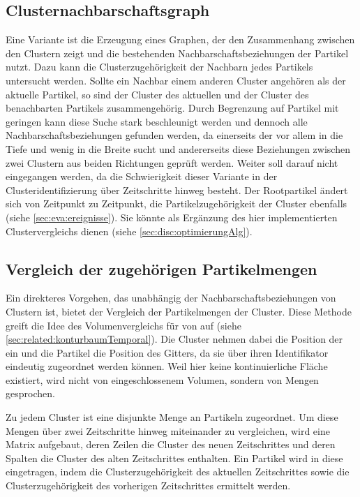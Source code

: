 \subsection*{Clusternachbarschaftsgraph}
Eine Variante ist die Erzeugung eines Graphen, der den Zusammenhang zwischen den Clustern zeigt und die bestehenden Nachbarschaftsbeziehungen der Partikel nutzt. Dazu kann die Clusterzugehörigkeit der Nachbarn jedes Partikels untersucht werden. Sollte ein Nachbar einem anderen Cluster angehören als der aktuelle Partikel, so sind der Cluster des aktuellen und der Cluster des benachbarten Partikels zusammengehörig. Durch Begrenzung auf Partikel mit geringen  kann diese Suche stark beschleunigt werden und dennoch alle Nachbarschaftsbeziehungen gefunden werden, da einerseits der \CFD vor allem in die Tiefe und wenig in die Breite sucht und andererseits diese Beziehungen zwischen zwei Clustern aus beiden Richtungen geprüft werden.
Weiter soll darauf nicht eingegangen werden, da die Schwierigkeit dieser Variante in der Clusteridentifizierung über Zeitschritte hinweg besteht. Der Rootpartikel ändert sich von Zeitpunkt zu Zeitpunkt, die Partikelzugehörigkeit der Cluster ebenfalls (siehe \autoref{sec:eva:ereignisse}). Sie könnte als Ergänzung des hier implementierten Clustervergleichs dienen (siehe \autoref{sec:disc:optimierungAlg}).

\subsection*{Vergleich der zugehörigen Partikelmengen}
Ein direkteres Vorgehen, das unabhängig der Nachbarschaftsbeziehungen von Clustern ist, bietet der Vergleich der Partikelmengen der Cluster. Diese Methode greift die Idee des Volumenvergleichs für  von  auf (siehe \autoref{sec:related:konturbaumTemporal}). Die Cluster nehmen dabei die Position der  ein und die Partikel die Position des Gitters, da sie über ihren Identifikator eindeutig zugeordnet werden können. Weil hier keine kontinuierliche Fläche existiert, wird nicht von eingeschlossenem Volumen, sondern von Mengen gesprochen.

Zu jedem Cluster ist eine disjunkte Menge an Partikeln zugeordnet. Um diese Mengen über zwei Zeitschritte hinweg miteinander zu vergleichen, wird eine Matrix aufgebaut, deren Zeilen die Cluster des neuen Zeitschrittes und deren Spalten die Cluster des alten Zeitschrittes enthalten. Ein Partikel wird in diese  eingetragen, indem die Clusterzugehörigkeit des aktuellen Zeitschrittes sowie die Clusterzugehörigkeit des vorherigen Zeitschrittes ermittelt werden.


